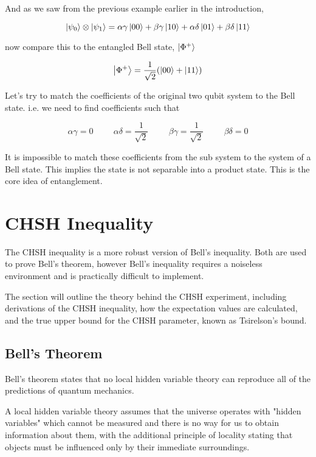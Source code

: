 \documentclass[12pt]{article}
\begin{document}
And as we saw from the previous example earlier in the introduction,

$$
\ket{\psi_0} \otimes\ket{\psi_1} = \alpha \gamma \ket{00} + \beta \gamma \ket{10} + \alpha \delta \ket{01} +\beta \delta \ket{11}
$$

now compare this to the entangled Bell state, $\ket{\Phi^+}$

$$
\ket{\Phi^+} = \frac{1}{\sqrt{2}} ( \ket{00} + \ket{11} )
$$

Let's try to match the coefficients of the original two qubit system to the Bell state. i.e. we need to find coefficients such that

$$
\alpha\gamma = 0 \hspace{1cm} \alpha\delta=\frac{1}{\sqrt{2}} \hspace{1cm}
\beta\gamma=\frac{1}{\sqrt{2}}\hspace{1cm}
\beta\delta = 0
$$

It is impossible to match these coefficients from the sub system to the system of a Bell state. This implies the state is not separable into a product state. This is the core idea of entanglement. 

\newpage
\section{CHSH Inequality}

The CHSH inequality is a more robust version of Bell's inequality. Both are used to prove Bell's theorem, however Bell's inequality requires a noiseless environment and is practically difficult to implement.

The section will outline the theory behind the CHSH experiment, including derivations of the CHSH inequality, how the expectation values are calculated, and the true upper bound for the CHSH parameter, known as Tsirelson's bound.



\subsection{Bell's Theorem}

Bell's theorem states that no local hidden variable theory can reproduce all of the predictions of quantum mechanics. \cite{Bell1964}

A local hidden variable theory assumes that the universe operates with "hidden variables" which cannot be measured and there is no way for us to obtain information about them, with the additional principle of locality stating that objects must be influenced only by their immediate surroundings.
\end{document}

